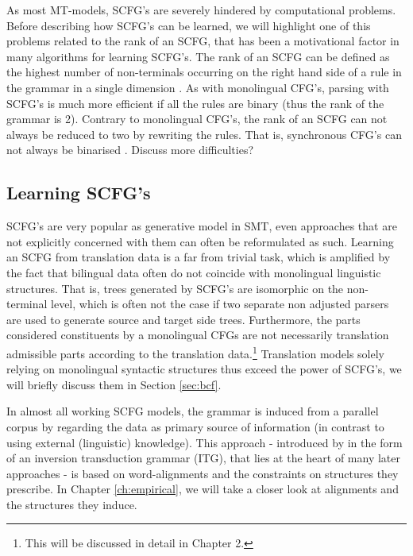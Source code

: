 \documentclass{report}
\theoremstyle{definition}
\theoremstyle{plain}
\begin{document}
As most MT-models, SCFG's are severely hindered by computational problems. Before describing how SCFG's can be learned, we will highlight one of this problems related to the rank of an SCFG, that has been a motivational factor in many algorithms for learning SCFG's. The rank of an SCFG can be defined as the highest number of non-terminals occurring on the right hand side of a rule in the grammar in a single dimension \citep{gildea2006factoring}. As with monolingual CFG's, parsing with SCFG's is much more efficient if all the rules are binary (thus the rank of the grammar is 2). Contrary to monolingual CFG's, the rank of an SCFG can not always be reduced to two by rewriting the rules. That is, synchronous CFG's can not always be binarised \citep{huang2009binarization}. 
Discuss more difficulties?


\subsection{Learning SCFG's}
\label{subsec:learningSCFGs}

SCFG's are very popular as generative model in SMT, even approaches that are not explicitly concerned with them can often be reformulated as such. Learning an SCFG from translation data is a far from trivial task, which is amplified by the fact that bilingual data often do not coincide with monolingual linguistic structures. That is, trees generated by SCFG's are isomorphic on the non-terminal level, which is often not the case if two separate non adjusted parsers are used to generate source and target side trees. Furthermore, the parts considered constituents by a monolingual CFGs are not necessarily translation admissible parts according to the translation data.\footnote{This will be discussed in detail in Chapter 2.} Translation models solely relying on monolingual syntactic structures thus exceed the power of SCFG's, we will briefly discuss them in Section \ref{sec:bcf}.

In almost all working SCFG models, the grammar is induced from a parallel corpus by regarding the data as primary source of information (in contrast to using external (linguistic) knowledge). This approach - introduced by \cite{wu1995algorithm} in the form of an inversion transduction grammar (ITG), that lies at the heart of many later approaches - is based on word-alignments and the constraints on structures they prescribe. In Chapter \ref{ch:empirical}, we will take a closer look at alignments and the structures they induce.
\end{document}
